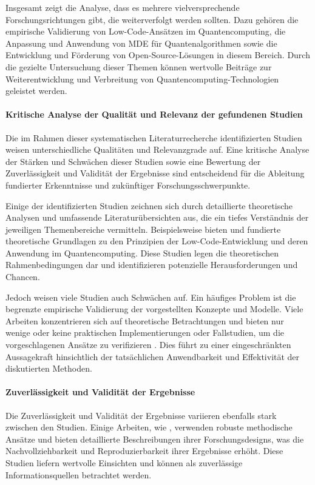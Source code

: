 Insgesamt zeigt die Analyse, dass es mehrere vielversprechende Forschungsrichtungen gibt, die weiterverfolgt werden sollten. 
Dazu gehören die empirische Validierung von Low-Code-Ansätzen im Quantencomputing, die Anpassung und Anwendung von MDE für 
Quantenalgorithmen sowie die Entwicklung und Förderung von Open-Source-Lösungen in diesem Bereich. Durch die gezielte 
Untersuchung dieser Themen können wertvolle Beiträge zur Weiterentwicklung und Verbreitung von Quantencomputing-Technologien geleistet werden.

\paragraph{Kritische Analyse der Qualität und Relevanz der gefundenen Studien}

Die im Rahmen dieser systematischen Literaturrecherche identifizierten Studien weisen unterschiedliche 
Qualitäten und Relevanzgrade auf. Eine kritische Analyse der Stärken und Schwächen dieser Studien sowie eine Bewertung 
der Zuverlässigkeit und Validität der Ergebnisse sind entscheidend für die Ableitung fundierter Erkenntnisse und zukünftiger Forschungsschwerpunkte.

Einige der identifizierten Studien zeichnen sich durch detaillierte theoretische Analysen und umfassende 
Literaturübersichten aus, die ein tiefes Verständnis der jeweiligen Themenbereiche vermitteln. 
Beispielsweise bieten \cite{Pérez-Delgado_2020} und \cite{Gemeinhardt_2021} fundierte theoretische Grundlagen 
zu den Prinzipien der Low-Code-Entwicklung und deren Anwendung im Quantencomputing. Diese Studien legen die 
theoretischen Rahmenbedingungen dar und identifizieren potenzielle Herausforderungen und Chancen.

Jedoch weisen viele Studien auch Schwächen auf. Ein häufiges Problem ist die begrenzte empirische Validierung 
der vorgestellten Konzepte und Modelle. Viele Arbeiten konzentrieren sich auf theoretische Betrachtungen und 
bieten nur wenige oder keine praktischen Implementierungen oder Fallstudien, um die vorgeschlagenen Ansätze 
zu verifizieren \cite{Amato_2023}. Dies führt zu einer eingeschränkten Aussagekraft hinsichtlich der tatsächlichen 
Anwendbarkeit und Effektivität der diskutierten Methoden.

\paragraph{Zuverlässigkeit und Validität der Ergebnisse}
Die Zuverlässigkeit und Validität der Ergebnisse variieren ebenfalls stark zwischen den Studien. Einige 
Arbeiten, wie \cite{Ahmad_2023}, verwenden robuste methodische Ansätze und bieten detaillierte Beschreibungen 
ihrer Forschungsdesigns, was die Nachvollziehbarkeit und Reproduzierbarkeit ihrer Ergebnisse erhöht. Diese Studien 
liefern wertvolle Einsichten und können als zuverlässige Informationsquellen betrachtet werden.

